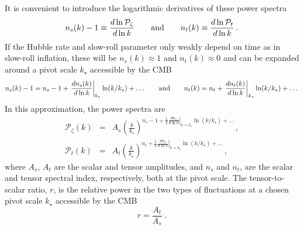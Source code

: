 It is convenient to introduce the logarithmic derivatives of these power spectra 
\begin{equation}\label{eq:specind}
n_s(k)-1\equiv\frac{d\ln \mathcal{P}_{\zeta}}{d\ln k}\qquad{\rm and}\qquad n_t(k)\equiv \frac{d\ln \mathcal{P}_t}{d\ln k}\,.
\end{equation}
If the Hubble rate and slow-roll parameter only weakly depend on time as in slow-roll inflation, these will be $n_s(k)\approx 1$ and $n_t(k)\approx 0$ and can be expanded around a pivot scale $k_\star$ accessible by the CMB
\begin{equation}
n_s(k)-1=n_s-1+\left.\frac{dn_s(k)}{d\ln k}\right|_{k_\star}\ln(k/k_\star)+\dots\qquad{\rm and}\qquad n_t(k)=n_t+\left.\frac{dn_t(k)}{d\ln k}\right|_{k_\star}\ln(k/k_\star)+\dots
\end{equation}
In this approximation, the power spectra are
\begin{eqnarray}
\mathcal{P}_{\zeta}(k)&=& A_s\left(\frac{k}{k_\star}\right)^{n_s-1+\frac{1}{2}\left.\frac{dn_s}{d\ln k}\right|_{k=k_\star}\ln(k/k_\star)+\dots}\,,\nonumber\\
\mathcal{P}_{t}(k)&=& A_t \left(\frac{k}{k_\star}\right)^{n_t+\frac{1}{2}\left.\frac{dn_t}{d\ln k}\right|_{k=k_\star}\ln(k/k_\star)+\dots}\,,
\end{eqnarray}
where $A_s$, $A_t$ are the scalar and tensor amplitudes, and $n_s$ and $n_t$, are the scalar and tensor spectral index, respectively, both at the pivot scale. 
The tensor-to-scalar ratio, $r$, is the relative power in the two types of fluctuations at a chosen pivot scale $k_\star$ accessible by the CMB
\begin{equation}
r=\frac{A_t}{A_s}\;.
\end{equation}

